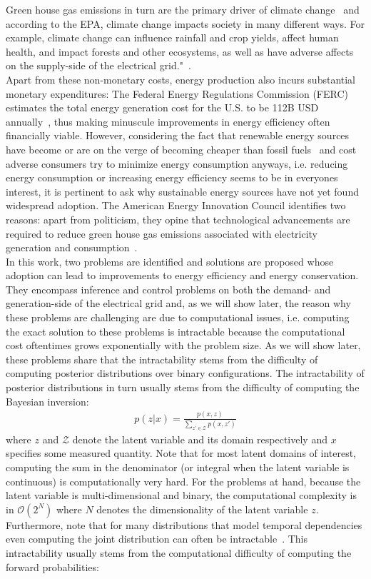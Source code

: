 \documentclass[11pt]{cmuthesis} %
\begin{document}
Green house gas emissions in turn are the primary driver of climate change~\cite{change2014mitigation} and according to the EPA, climate change impacts society in many different ways. For example, climate change can influence rainfall and crop yields, affect human health, and impact forests and other ecosystems, as well as have adverse affects on the supply-side of the electrical grid."~\cite{EPA}.\\
Apart from these non-monetary costs, energy production also incurs substantial monetary expenditures: The Federal Energy Regulations Commission (FERC) estimates the total energy generation cost for the U.S. to be 112B USD annually~\cite{ferc2012history}, thus making minuscule improvements in energy efficiency often financially viable. However, considering the fact that renewable energy sources have become or are on the verge of becoming cheaper than fossil fuels~\cite{eia2016} and cost adverse consumers try to minimize energy consumption anyways, i.e. reducing energy consumption or increasing energy efficiency seems to be in everyones interest, it is pertinent to ask why sustainable energy sources have not yet found widespread adoption. The American Energy Innovation Council identifies two reasons: apart from politicism, they opine that technological advancements are required to reduce green house gas emissions associated with electricity generation and consumption~\cite{AEIC}.\\
In this work, two problems are identified and solutions are proposed whose adoption can lead to improvements to energy efficiency and energy conservation. They encompass inference and control problems on both the demand- and generation-side of the electrical grid and, as we will show later, the reason why these problems are challenging are due to computational issues, i.e. computing the exact solution to these problems is intractable because the computational cost oftentimes grows exponentially with the problem size. As we will show later, these problems share that the intractability stems from the difficulty of computing posterior distributions over binary configurations. The intractability of posterior distributions in turn usually stems from the difficulty of computing the Bayesian inversion:
\begin{align}
p(z|x) = \frac{p(x,z)}{\sum_{z' \in \mathcal{Z}} p(x,z')} \label{eq:bayes_inversion}
\end{align}
 where $z$ and $\mathcal{Z}$ denote the latent variable and its domain respectively and $x$ specifies some measured quantity. Note that for most latent domains of interest, computing the sum in the denominator (or integral when the latent variable is continuous) is computationally very hard. For the problems at hand, because the latent variable is multi-dimensional and binary, the computational complexity is in $\mathcal{O}(2^N)$ where $N$ denotes the dimensionality of the latent variable $z$. Furthermore, note that for many distributions that model temporal dependencies even computing the joint distribution can often be intractable~\cite{ghahramani1996factorial}. This intractability usually stems from the computational difficulty of computing the forward probabilities:
\end{document}
